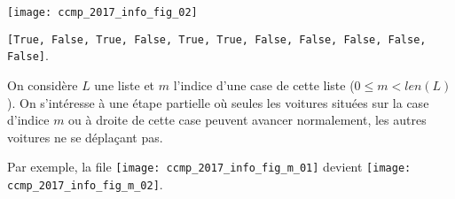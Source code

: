 \begin{center}
	\texttt{[image: ccmp\_2017\_info\_fig\_02]}
\end{center}

\ifprof
\begin{corrige}
\lstinline{[True, False, True, False, True, True, False, False, False, False, False]}.
\end{corrige}
\else
\fi


On considère $L$ une liste et $m$ l'indice d'une case de cette liste ($0 \leqslant m < len(L)$). On
s'intéresse à une étape partielle où seules les voitures situées sur la case d'indice $m$ ou à droite de
cette case peuvent avancer normalement, les autres voitures ne se déplaçant pas.


Par exemple, la file  \texttt{[image: ccmp\_2017\_info\_fig\_m\_01]}
 devient \texttt{[image: ccmp\_2017\_info\_fig\_m\_02]}.

\medskip





